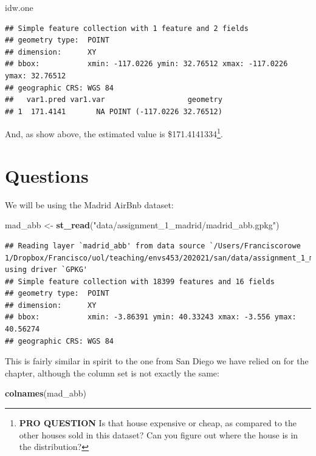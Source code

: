 \documentclass[
]{book}
\newenvironment{Shaded}{\begin{snugshade}}{\end{snugshade}}
\newcommand{\KeywordTok}[1]{\textcolor[rgb]{0.13,0.29,0.53}{\textbf{#1}}}
\newcommand{\NormalTok}[1]{#1}
\newcommand{\StringTok}[1]{\textcolor[rgb]{0.31,0.60,0.02}{#1}}
\begin{document}
\begin{Shaded}
\begin{Highlighting}[]
\NormalTok{idw.one}
\end{Highlighting}
\end{Shaded}

\begin{verbatim}
## Simple feature collection with 1 feature and 2 fields
## geometry type:  POINT
## dimension:      XY
## bbox:           xmin: -117.0226 ymin: 32.76512 xmax: -117.0226 ymax: 32.76512
## geographic CRS: WGS 84
##   var1.pred var1.var                   geometry
## 1  171.4141       NA POINT (-117.0226 32.76512)
\end{verbatim}

And, as show above, the estimated value is \$171.4141334\footnote{\textbf{PRO QUESTION} Is that house expensive or cheap, as compared to the other houses sold in this dataset? Can you figure out where the house is in the distribution?}.

\hypertarget{questions}{%
\section{Questions}\label{questions}}

We will be using the Madrid AirBnb dataset:

\begin{Shaded}
\begin{Highlighting}[]
\NormalTok{mad_abb <-}\StringTok{ }\KeywordTok{st_read}\NormalTok{(}\StringTok{"data/assignment_1_madrid/madrid_abb.gpkg"}\NormalTok{)}
\end{Highlighting}
\end{Shaded}

\begin{verbatim}
## Reading layer `madrid_abb' from data source `/Users/Franciscorowe 1/Dropbox/Francisco/uol/teaching/envs453/202021/san/data/assignment_1_madrid/madrid_abb.gpkg' using driver `GPKG'
## Simple feature collection with 18399 features and 16 fields
## geometry type:  POINT
## dimension:      XY
## bbox:           xmin: -3.86391 ymin: 40.33243 xmax: -3.556 ymax: 40.56274
## geographic CRS: WGS 84
\end{verbatim}

This is fairly similar in spirit to the one from San Diego we have relied on for the chapter, although the column set is not exactly the same:

\begin{Shaded}
\begin{Highlighting}[]
\KeywordTok{colnames}\NormalTok{(mad_abb)}
\end{Highlighting}
\end{Shaded}
\end{document}
